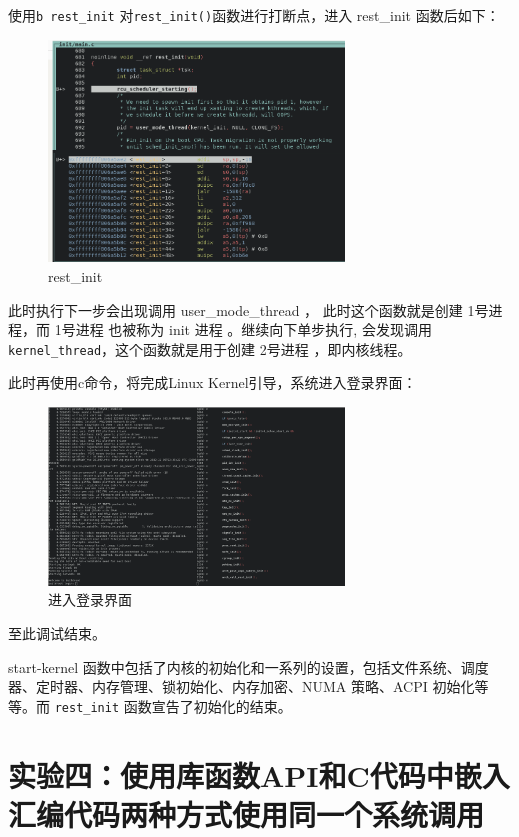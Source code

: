 \documentclass[lang=cn,10pt]{elegantbook}
\begin{document}
\newpage
使用\lstinline{b rest_init} 对\lstinline{rest_init()}函数进行打断点，进入 rest\_init 函数后如下：
\begin{figure}[htbp]
  \centering
  \includegraphics[width=0.7\textwidth]{image/image-20231111155131309.png}
  \caption{rest\_init}
\end{figure}


此时执行下一步会出现调用 user\_mode\_thread ， 此时这个函数就是创建 1号进程，而 1号进程 也被称为 init 进程 。继续向下单步执行, 会发现调用 \lstinline{kernel_thread}，这个函数就是用于创建 2号进程 ，即内核线程。

此时再使用c命令，将完成Linux Kernel引导，系统进入登录界面：
\begin{figure}[htbp]
  \centering
  \includegraphics[width=0.7\textwidth]{image/image-20231105113622844.png}
  \caption{进入登录界面}
\end{figure}

至此调试结束。

start-kernel 函数中包括了内核的初始化和一系列的设置，包括文件系统、调度器、定时器、内存管理、锁初始化、内存加密、NUMA 策略、ACPI 初始化等等。而 \lstinline{rest_init} 函数宣告了初始化的结束。

\chapter{实验四：使用库函数API和C代码中嵌入汇编代码两种方式使用同一个系统调用}
\end{document}
